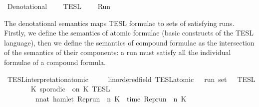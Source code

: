 %
\begin{isabellebody}%
%
%
\isadelimdocument
%
\endisadelimdocument
%
\isatagdocument
%
\isamarkuptrue%
%
\endisatagdocument
{\isafolddocument}%
%
\isadelimdocument
%
\endisadelimdocument
%
\isadelimtheory
%
\endisadelimtheory
%
\isatagtheory
{}\isamarkupfalse%
\ Denotational\isanewline
{}\isanewline
\ \ \ \ TESL\isanewline
\ \ \ \ Run\isanewline
\isanewline
{}%
\endisatagtheory
{\isafoldtheory}%
%
\isadelimtheory
%
\endisadelimtheory
%
\begin{isamarkuptext}%
The denotational semantics maps TESL formulae to sets of satisfying runs.
  Firstly, we define the semantics of atomic formulae (basic constructs of the 
  TESL language), then we define the semantics of compound formulae as the
  intersection of the semantics of their components: a run must satisfy all
  the individual formulae of a compound formula.%
\end{isamarkuptext}\isamarkuptrue%
%
\isadelimdocument
%
\endisadelimdocument
%
\isatagdocument
%
\isamarkuptrue%
%
\endisatagdocument
{\isafolddocument}%
%
\isadelimdocument
%
\endisadelimdocument
\isanewline
{}\isamarkupfalse%
\ TESL{\isacharunderscore}interpretation{\isacharunderscore}atomic\isanewline
\ \ \ \ {\isacharcolon}{\isacharcolon}\ {\isacartoucheopen}{\isacharparenleft}{\isacharprime}{\isasymtau}{\isacharcolon}{\isacharcolon}linordered{\isacharunderscore}field{\isacharparenright}\ TESL{\isacharunderscore}atomic\ {\isasymRightarrow}\ {\isacharprime}{\isasymtau}\ run\ set{\isacartoucheclose}\ {\isacharparenleft}{\isachardoublequoteopen}{\isasymlbrakk}\ {\isacharunderscore}\ {\isasymrbrakk}\isactrlsub T\isactrlsub E\isactrlsub S\isactrlsub L{\isachardoublequoteclose}{\isacharparenright}\isanewline
{}\isanewline
\ \ %
\isanewline
\ \ \ \ {\isacartoucheopen}{\isasymlbrakk}\ K\ sporadic\ {\isasymtau}\ on\ K\ {\isasymrbrakk}\isactrlsub T\isactrlsub E\isactrlsub S\isactrlsub L\ {\isacharequal}\isanewline
\ \ \ \ \ \ \ \ {\isacharbraceleft}{\isasymrho}{\isachardot}\ {\isasymexists}n{\isacharcolon}{\isacharcolon}nat{\isachardot}\ hamlet\ {\isacharparenleft}{\isacharparenleft}Rep{\isacharunderscore}run\ {\isasymrho}{\isacharparenright}\ n\ K\ {\isasymand}\ time\ {\isacharparenleft}{\isacharparenleft}Rep{\isacharunderscore}run\ {\isasymrho}{\isacharparenright}\ n\ K\ {\isacharequal}\ {\isasymtau}{\isacharbraceright}{\isacartoucheclose}\isanewline

\end{isabellebody}
